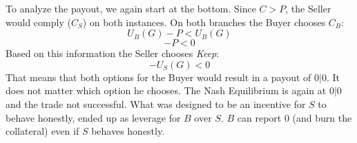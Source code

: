 \documentclass{cacthesis}
\begin{document}
To analyze the payout, we again start at the bottom. Since $C>P$, the Seller would comply ($C_S$) on both instances.\newline
On both branches the Buyer chooses $C_B$: \[U_B(G)-P < U_B(G)\] \[-P < 0\]
Based on this information the Seller chooses \emph{Keep}: \[-U_S(G) < 0\]
That means that both options for the Buyer would result in a payout of $0|0$. It does not matter which option he chooses.\newline
The Nash Equilibrium is again at $0|0$ and the trade not successful.\newline
What was designed to be an incentive for $S$ to behave honestly, ended up as leverage for $B$ over $S$. $B$ can report 0 (and burn the collateral) even if $S$ behaves honestly. 
\end{document}
